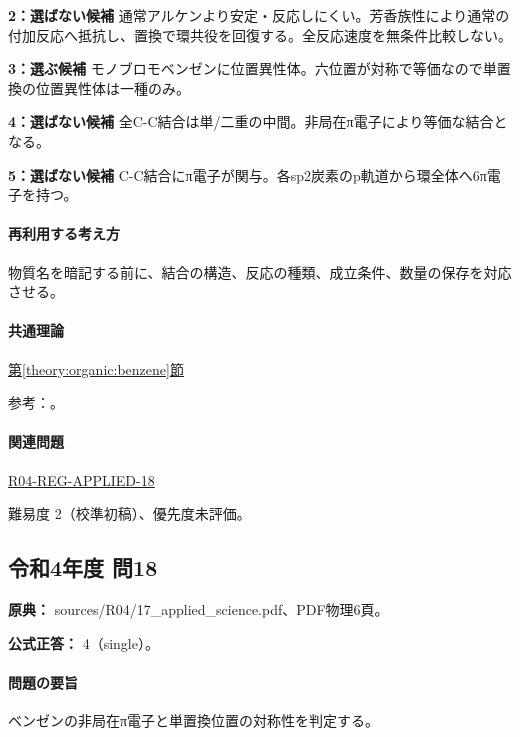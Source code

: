 \noindent\textbf{2：選ばない候補} 通常アルケンより安定・反応しにくい。芳香族性により通常の付加反応へ抵抗し、置換で環共役を回復する。全反応速度を無条件比較しない。\par

\noindent\textbf{3：選ぶ候補} モノブロモベンゼンに位置異性体。六位置が対称で等価なので単置換の位置異性体は一種のみ。\par

\noindent\textbf{4：選ばない候補} 全C-C結合は単/二重の中間。非局在π電子により等価な結合となる。\par

\noindent\textbf{5：選ばない候補} C-C結合にπ電子が関与。各sp2炭素のp軌道から環全体へ6π電子を持つ。\par

\paragraph{再利用する考え方} 物質名を暗記する前に、結合の構造、反応の種類、成立条件、数量の保存を対応させる。

\paragraph{共通理論} \hyperref[theory:organic:benzene]{第\ref*{theory:organic:benzene}節}

\par 参考：\cite{organic_benzene}。

\paragraph{関連問題} \hyperref[q:r04-reg-applied-18]{R04-REG-APPLIED-18}

\par 難易度 2（校準初稿）、優先度未評価。

\subsection{令和4年度 問18}
\label{q:r04-reg-applied-18}

\noindent\textbf{原典：} sources/R04/17\_applied\_science.pdf、PDF物理6頁。

\textbf{公式正答：} 4（single）。

\paragraph{問題の要旨} ベンゼンの非局在π電子と単置換位置の対称性を判定する。

